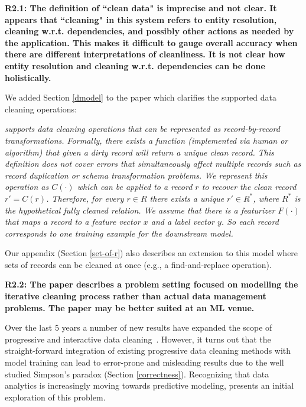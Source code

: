 \noindent\textbf{R2.1: The definition of ``clean data" is imprecise and not clear. It appears that ``cleaning" in this system refers to entity resolution, cleaning w.r.t. dependencies, and possibly other actions as needed by the application. This makes it difficult to gauge overall accuracy when there are different interpretations of cleanliness. It is not clear how entity resolution and cleaning w.r.t. dependencies can be done holistically.}

We added Section \ref{dmodel} to the paper which clarifies the supported data cleaning operations:

\emph{\sys supports data cleaning operations that can be represented as record-by-record transformations.
Formally, there exists a function (implemented via human or algorithm) that given a dirty record will return a unique clean record.
This definition does not cover errors that simultaneously affect multiple records such as record duplication or schema transformation problems.
We represent this operation as $C(\cdot)$ which can be applied to a record $r$ to recover the clean record $r' = C(r)$.
Therefore, for every $r \in R$ there exists a unique $r' \in R^*$, where $R^*$ is the hypothetical fully cleaned relation.
We assume that there is a featurizer $F(\cdot)$ that maps a record to a feature vector $x$ and a label vector $y$.
So each record corresponds to one training example for the downstream model.}

\vspace{0.5em}

Our appendix (Section \ref{set-of-r}) also describes an extension to this model where sets of records can be cleaned at once (e.g., a find-and-replace operation).

\vspace{0.5em}

\noindent\textbf{R2.2: The paper describes a problem setting focused on modelling the iterative cleaning process rather than actual data management problems. The paper may be better suited at an ML venue.}

Over the last 5 years a number of new results have expanded the scope of progressive and interactive data cleaning~\cite{mayfield2010eracer, DBLP:journals/pvldb/YakoutENOI11, yakout2013don, altowim2014progressive, whang2014incremental, papenbrock2015progressive, gruenheid2014incremental}.
However,  it turns out that the straight-forward integration of existing progressive data cleaning methods with model training can lead to error-prone and misleading results due to the well studied Simpson's paradox (Section \ref{correctness}).
Recognizing that data analytics is increasingly moving towards predictive modeling, \sys presents an initial exploration of this problem.  

